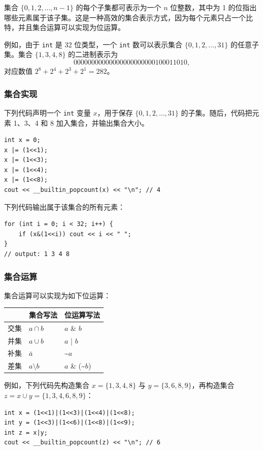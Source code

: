 集合 $\{0,1,2,\ldots,n-1\}$ 的每个子集都可表示为一个 $n$ 位整数，其中为 1 的位指出哪些元素属于该子集。这是一种高效的集合表示方式，因为每个元素只占一个比特，并且集合运算可以实现为位运算。

例如，由于 \texttt{int} 是 32 位类型，一个 \texttt{int} 数可以表示集合 $\{0,1,2,\ldots,31\}$ 的任意子集。集合 $\{1,3,4,8\}$ 的二进制表示为
\[00000000000000000000000100011010,\]
对应数值 $2^8+2^4+2^3+2^1=282$。

\subsubsection{集合实现}

下列代码声明一个 \texttt{int} 变量 $x$，用于保存 $\{0,1,2,\ldots,31\}$ 的子集。随后，代码把元素 1、3、4 和 8 加入集合，并输出集合大小。
\begin{lstlisting}
int x = 0;
x |= (1<<1);
x |= (1<<3);
x |= (1<<4);
x |= (1<<8);
cout << __builtin_popcount(x) << "\n"; // 4
\end{lstlisting}
下列代码输出属于该集合的所有元素：
\begin{lstlisting}
for (int i = 0; i < 32; i++) {
    if (x&(1<<i)) cout << i << " ";
}
// output: 1 3 4 8
\end{lstlisting}

\subsubsection{集合运算}

集合运算可以实现为如下位运算：

\begin{center}
\begin{tabular}{lll}
& 集合写法 & 位运算写法 \\
\hline
交集 & $a \cap b$ & $a$ \& $b$ \\
并集 & $a \cup b$ & $a$ | $b$ \\
补集 & $\bar a$ & \textasciitilde$a$ \\
差集 & $a \setminus b$ & $a$ \& (\textasciitilde$b$) \\
\end{tabular}
\end{center}

例如，下列代码先构造集合 $x=\{1,3,4,8\}$ 与 $y=\{3,6,8,9\}$，再构造集合 $z=x\cup y=\{1,3,4,6,8,9\}$：

\begin{lstlisting}
int x = (1<<1)|(1<<3)|(1<<4)|(1<<8);
int y = (1<<3)|(1<<6)|(1<<8)|(1<<9);
int z = x|y;
cout << __builtin_popcount(z) << "\n"; // 6
\end{lstlisting}


